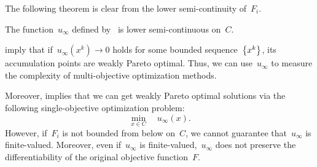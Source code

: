\documentclass[../../main]{subfiles}
\begin{document}
The following theorem is clear from the lower semi-continuity of~$F_i$.
\begin{theorem} 
    The function~$u_\infty$ defined by~ is lower semi-continuous on~$C$.
\end{theorem}
 imply that if~$u_\infty\left(x^k\right) \to 0$ holds for some bounded sequence~$\set*{x^k}$, its accumulation points are weakly Pareto optimal.
Thus, we can use~$u_\infty$ to measure the complexity of multi-objective optimization methods.

Moreover,  implies that we can get weakly Pareto optimal solutions via the following single-objective optimization problem:
\begin{equation}
    \min_{x \in C} \quad u_\infty(x)
    .\end{equation}
However, if~$F_i$ is not bounded from below on~$C$, we cannot guarantee that~$u_\infty$ is finite-valued.
Moreover, even if~$u_\infty$ is finite-valued,~$u_\infty$ does not preserve the differentiability of the original objective function~$F$.
\end{document}
